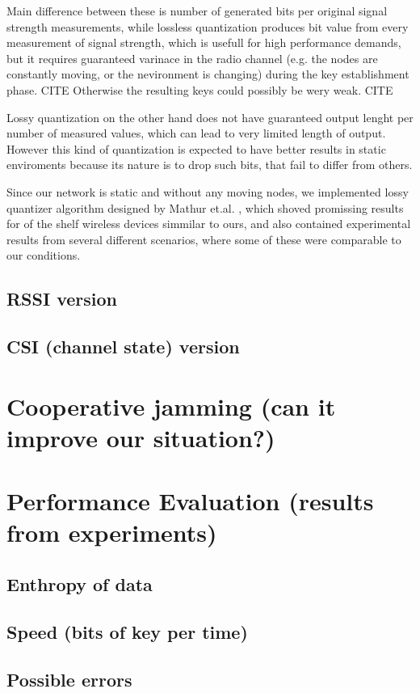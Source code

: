 \documentclass[
  digital, %
  table,   %
  nolof,     %
  nolot,     %
]{fithesis3}
\begin{document}
    Main difference between these is number of generated bits per original signal strength measurements, while lossless quantization produces bit value from every measurement of signal strength, which is usefull for high performance demands, but it requires guaranteed varinace in the radio channel (e.g. the nodes are constantly moving, or the nevironment is changing) during the key establishment phase. CITE Otherwise the resulting keys could possibly be wery weak. CITE

    Lossy quantization on the other hand does not have guaranteed output lenght per number of measured values, which can lead to very limited length of output. However this kind of quantization is expected to have better results in static enviroments %
    because its nature is to drop such bits, that fail to differ from others.

    Since our network is static and without any moving nodes, we implemented lossy quantizer algorithm designed by Mathur et.al.%
    , which shoved promissing results for of the shelf wireless devices simmilar to ours, and also contained experimental results from several different scenarios, where some of these were comparable to our conditions.   


    \subsection{RSSI version}
    \subsection{CSI (channel state) version}
  \section{Cooperative jamming (can it improve our situation?)}
  \section{Performance Evaluation (results from experiments)}
    \subsection{Enthropy of data}
    \subsection{Speed (bits of key per time)}
    \subsection{Possible errors}
\end{document}
